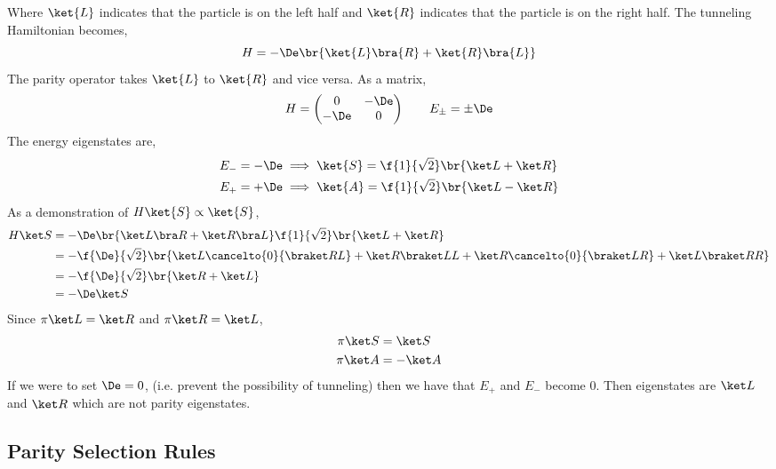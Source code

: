 \documentclass{article}
\begin{document}
\begin{center}
\end{center}
Where $\ket{L}$ indicates that the particle is on the left half and $\ket{R}$ indicates that the particle is on the right half. The tunneling Hamiltonian becomes,
\[ H = - \De \br{\ket{L} \bra{R} + \ket{R}\bra{L}} \]
The parity operator takes $\ket{L}$ to $\ket{R}$ and vice versa. As a matrix,
\[ H = \begin{pmatrix}
    0 & - \De \\
    - \De & 0
\end{pmatrix} \qquad E_{\pm} = \pm \De \]
The energy eigenstates are,
\begin{align*}
E_- &= - \De \implies \ket{S} = \f{1}{\sqrt 2} \br{\ket L + \ket R} \\
E_+ &= + \De \implies \ket{A} = \f{1}{\sqrt 2} \br{\ket L - \ket R}
\end{align*}
As a demonstration of $H \ket{S} \propto \ket{S}$,
\begin{align*}
H \ket S
&= - \De \br{\ket L \bra R + \ket R \bra L} \f{1}{\sqrt 2}\br{\ket L + \ket R}  \\
&= - \f{\De}{\sqrt 2} \br{\ket L \cancelto{0}{\braket R L} + \ket R \braket L L +\ket R \cancelto{0}{\braket L R}+\ket L \braket R R}   \\
&= - \f{\De}{\sqrt 2} \br{\ket R + \ket L} \\
&= - \De \ket S
\end{align*}
Since $\pi \ket L = \ket R$ and $\pi \ket R = \ket L$,
\begin{align*}
    \pi \ket S & = \ket S\\
    \pi \ket A & = -\ket A
\end{align*}
If we were to set $\De= 0$, (i.e. prevent the possibility of tunneling) then we have that $E_+$ and $E_-$ become $0$. Then eigenstates are $\ket L$ and $\ket R$ which are not parity eigenstates. \\

\subsection{Parity Selection Rules}
\end{document}
